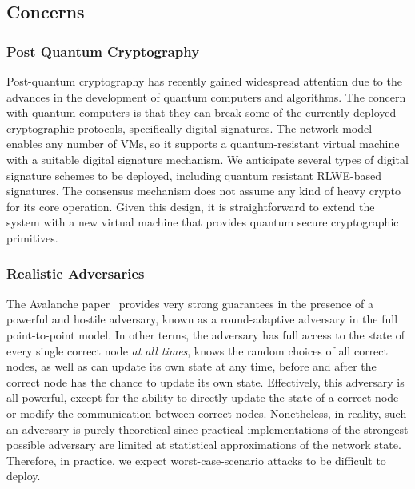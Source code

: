 \documentclass[runningheads]{llncs}
\begin{document}
\subsection{Concerns}
\subsubsection{Post Quantum Cryptography}
Post-quantum cryptography has recently gained widespread attention due to the advances in the development of quantum computers and algorithms. The concern with quantum computers is that they can break some of the currently deployed cryptographic protocols, specifically digital signatures. 
The \AVAPlatformName{} network model enables any number of VMs, so it supports a quantum-resistant virtual machine with a suitable digital signature mechanism. We anticipate several types of digital signature schemes to be deployed, including quantum resistant RLWE-based signatures. The consensus mechanism does not assume any kind of heavy crypto for its core operation. Given this design, it is straightforward to extend the system with a new virtual machine that provides quantum secure cryptographic primitives.

\subsubsection{Realistic Adversaries}
The Avalanche paper~\cite{avalanche} provides very strong guarantees in the presence of a powerful and hostile adversary, known as a round-adaptive adversary in the full point-to-point model. 
In other terms, the adversary has full access to the state of every single correct node \emph{at all times}, knows the random choices of all correct nodes, as well as can update its own state at any time, before and after the correct node has the chance to update its own state. 
Effectively, this adversary is all powerful, except for the ability to directly update the state of a correct node or modify the communication between correct nodes. 
Nonetheless, in reality, such an adversary is purely theoretical since practical implementations of the strongest possible adversary are limited at statistical approximations of the network state. Therefore, in practice, we expect worst-case-scenario attacks to be difficult to deploy. 
\end{document}
